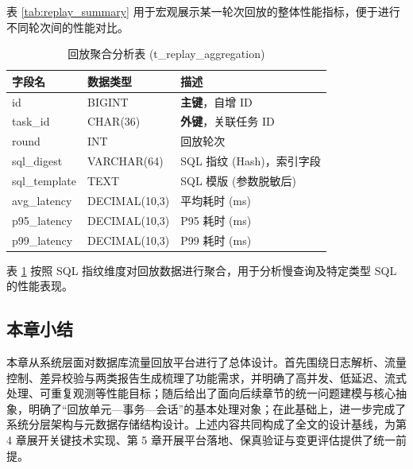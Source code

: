 表 \ref{tab:replay_summary} 用于宏观展示某一轮次回放的整体性能指标，便于进行不同轮次间的性能对比。

\begin{table}[htbp]
    \centering
    \caption{回放聚合分析表 (t\_replay\_aggregation)}
    \label{tab:replay_aggregation}
    \begin{tabular}{l l p{6cm}}
        \toprule
        \textbf{字段名} & \textbf{数据类型} & \textbf{描述} \\
        \midrule
        id & BIGINT & \textbf{主键}，自增 ID \\
        task\_id & CHAR(36) & \textbf{外键}，关联任务 ID \\
        round & INT & 回放轮次 \\
        sql\_digest & VARCHAR(64) & SQL 指纹 (Hash)，索引字段 \\
        sql\_template & TEXT & SQL 模版 (参数脱敏后) \\
        avg\_latency & DECIMAL(10,3) & 平均耗时 (ms) \\
        p95\_latency & DECIMAL(10,3) & P95 耗时 (ms) \\
        p99\_latency & DECIMAL(10,3) & P99 耗时 (ms) \\
        \bottomrule
    \end{tabular}
\end{table}

表 \ref{tab:replay_aggregation} 按照 SQL 指纹维度对回放数据进行聚合，用于分析慢查询及特定类型 SQL 的性能表现。
\subsection{本章小结}

本章从系统层面对数据库流量回放平台进行了总体设计。首先围绕日志解析、流量控制、差异校验与两类报告生成梳理了功能需求，并明确了高并发、低延迟、流式处理、可重复观测等性能目标；随后给出了面向后续章节的统一问题建模与核心抽象，明确了“回放单元—事务—会话”的基本处理对象；在此基础上，进一步完成了系统分层架构与元数据存储结构设计。上述内容共同构成了全文的设计基线，为第 4 章展开关键技术实现、第 5 章开展平台落地、保真验证与变更评估提供了统一前提。
